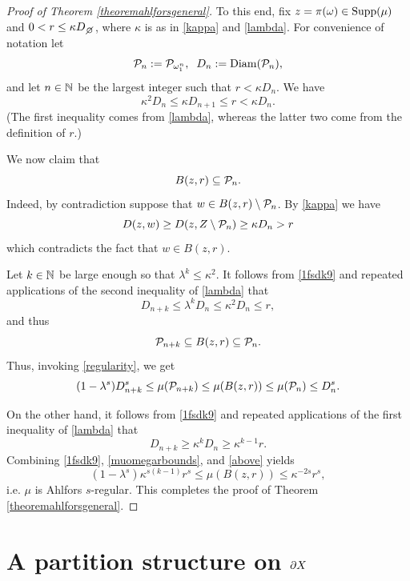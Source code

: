 \begin{proof}[Proof of Theorem \ref{theoremahlforsgeneral}]
To this end, fix $z = \pi(\omega)\in\operatorname{Supp}(\mu)$ and $0 < r \leq \kappa D_\smallemptyset$, where $\kappa$ is as in \eqref{kappa} and \eqref{lambda}. For convenience of notation let 
\[
\mathcal P_n := \mathcal P_{\omega_1^n}, \;\; D_n := \operatorname{Diam}(\mathcal P_n),
\]
and let $n\in\N$ be the largest integer such that $r < \kappa D_n$. We have
\begin{equation}\label{1fsdk9}
\kappa^2 D_n \leq \kappa D_{n + 1} \leq r < \kappa D_n.
\end{equation}
(The first inequality comes from \eqref{lambda}, whereas the latter two come from the definition of $r$.)

We now claim that
\[
B(z,r)\subseteq \mathcal P_n.
\]
Indeed, by contradiction suppose that $w\in B(z,r)\setminus \mathcal P_n$. By \eqref{kappa} we have
\[
D(z,w)\geq D(z,Z\setminus \mathcal P_n)\geq \kappa D_n > r
\]
which contradicts the fact that $w\in B(z,r)$.

Let $k\in\N$ be large enough so that $\lambda^k\leq\kappa^2$. It follows from \eqref{1fsdk9} and repeated applications of the second inequality of \eqref{lambda} that
\[
D_{n + k} \leq \lambda^k D_n \leq \kappa^2 D_n \leq r,
\]
and thus
\[
\mathcal P_{n + k} \subseteq B(z,r)\subseteq \mathcal P_n.
\]
Thus, invoking \eqref{regularity}, we get
\begin{equation}
\label{muomegarbounds}
(1 - \lambda^s)D_{n + k}^s \leq \mu(\mathcal P_{n + k}) \leq \mu(B(z,r))
\leq \mu(\mathcal P_n) \leq D_n^s. 
\end{equation}

On the other hand, it follows from \eqref{1fsdk9} and repeated applications of the first inequality of \eqref{lambda} that
\begin{equation}
\label{above}
D_{n + k} \geq \kappa^k D_n \geq \kappa^{k - 1}r.
\end{equation}
Combining \eqref{1fsdk9}, \eqref{muomegarbounds}, and \eqref{above} yields
\[
(1 - \lambda^s)\kappa^{s(k - 1)}r^s \leq \mu(B(z,r)) \leq \kappa^{-2s}r^s,
\]
i.e. $\mu$ is Ahlfors $s$-regular. This completes the proof of Theorem \ref{theoremahlforsgeneral}.
\end{proof}

\section{A partition structure on $\partial X$}
\label{subsectionlemmastructure}

